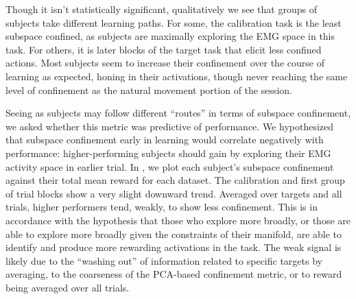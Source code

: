 \documentclass[../main.tex]{subfiles}
\begin{document}
Though it isn't statistically significant, qualitatively we see that groups of subjects take different learning paths. For some, the calibration task is the least subspace confined, as subjects are maximally exploring the EMG space in this task. For others, it is later blocks of the target task that elicit less confined actions. Most subjects seem to increase their confinement over the course of learning as expected, honing in their activations, though never reaching the same level of confinement as the natural movement portion of the session. 

Seeing as subjects may follow different ``routes'' in terms of subspace confinement, we asked whether this metric was predictive of performance. We hypothesized that subspace confinement early in learning would correlate negatively with performance: higher-performing subjects should gain by exploring their EMG activity space in earlier trial. In , we plot each subject's subspace confinement against their total mean reward for each dataset. The calibration and first group of trial blocks show a very slight downward trend. Averaged over targets and all trials, higher performers tend, weakly, to show less confinement. This is in accordance with the hypothesis that those who explore more broadly, or those are able to explore more broadly given the constraints of their manifold, are able to identify and produce more rewarding activations in the task. The weak signal is likely due to the ``washing out'' of information related to specific targets by averaging, to the coarseness of the PCA-based confinement metric, or to reward being averaged over all trials.


\end{document}
